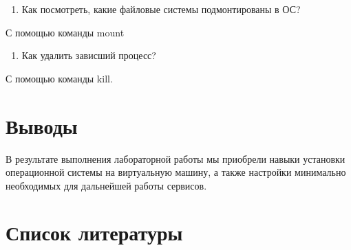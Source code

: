 \documentclass[
  12pt,
  a4paper,
  DIV=11,
  numbers=noendperiod]{scrreprt}
\providecommand{\tightlist}{%
  \setlength{\itemsep}{0pt}\setlength{\parskip}{0pt}}\usepackage{longtable,booktabs,array}
\begin{document}
\begin{enumerate}
\def\labelenumi{\arabic{enumi})}
\setcounter{enumi}{3}
\tightlist
\item
  Как посмотреть, какие файловые системы подмонтированы в ОС?
\end{enumerate}

С помощью команды mount

\begin{enumerate}
\def\labelenumi{\arabic{enumi})}
\setcounter{enumi}{4}
\tightlist
\item
  Как удалить зависший процесс?
\end{enumerate}

С помощью команды kill.

\chapter{Выводы}\label{ux432ux44bux432ux43eux434ux44b}

В результате выполнения лабораторной работы мы приобрели навыки
установки операционной системы на виртуальную машину, а также настройки
минимально необходимых для дальнейшей работы сервисов.

\chapter*{Список
литературы}\label{ux441ux43fux438ux441ux43eux43a-ux43bux438ux442ux435ux440ux430ux442ux443ux440ux44b}

\printbibliography[heading=none]
\end{document}
